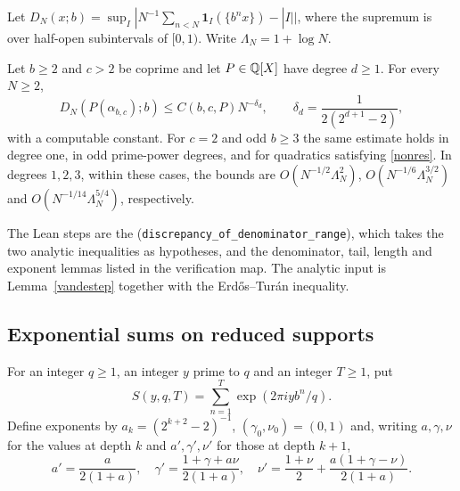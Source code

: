\documentclass[11pt]{article}
\newcommand{\ee}[1]{\exp(2\pi i #1)}
\begin{document}
Let \(D_N(x;b)=\sup_I|N^{-1}\sum_{n<N}\mathbf1_I(\{b^nx\})-|I||\),
where the supremum is over half-open subintervals of \([0,1)\).
Write \(\Lambda_N=1+\log N\).
\begin{theorem}\label{rate}
Let \(b\ge2\) and \(c>2\) be coprime and let \(P\in\mathbb Q[X]\) have degree
\(d\ge1\). For every \(N\ge2\),
\[
 D_N(P(\alpha_{b,c});b)\le C(b,c,P)N^{-\delta_d},\qquad
 \delta_d=\frac{1}{2(2^{d+1}-2)},
\]
with a computable constant. For \(c=2\) and odd \(b\ge3\) the same
estimate holds in degree one, in odd prime-power degrees, and for
quadratics satisfying \eqref{nonres}. In degrees \(1,2,3\), within these
cases, the bounds are \(O(N^{-1/2}\Lambda_N^2)\),
\(O(N^{-1/6}\Lambda_N^{3/2})\) and \(O(N^{-1/14}\Lambda_N^{5/4})\),
respectively. 
\end{theorem}
The Lean steps are the  (\texttt{discrepancy\_of\_denominator\_range}), which takes the two
analytic inequalities as hypotheses, and the denominator, tail, length and
exponent lemmas listed in the verification map. The analytic input is
Lemma~\ref{vandestep} together with the Erd\H os--Tur\'an inequality.

\subsection{Exponential sums on reduced supports}
For an integer \(q\ge1\), an integer \(y\) prime to \(q\) and an integer
\(T\ge1\), put
\[
 S(y,q,T)=\sum_{n=1}^T \ee{yb^n/q}.
\]
Define exponents by \(a_k=(2^{k+2}-2)^{-1}\), \((\gamma_0,\nu_0)=(0,1)\) and,
writing \(a,\gamma,\nu\) for the values at depth \(k\) and
\(a',\gamma',\nu'\) for those at depth \(k+1\),
\begin{equation}\label{exprec}
 a'=\frac a{2(1+a)},\quad
 \gamma'=\frac{1+\gamma+a\nu}{2(1+a)},\quad
 \nu'=\frac{1+\nu}{2}+\frac{a(1+\gamma-\nu)}{2(1+a)} .
\end{equation}
\end{document}
